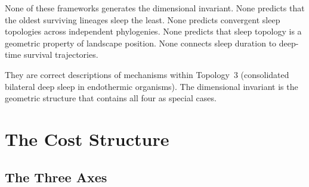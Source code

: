 \documentclass[10pt, a4paper]{article}
\begin{document}
None of these frameworks generates
the dimensional invariant. None predicts
that the oldest surviving lineages sleep
the least. None predicts convergent sleep
topologies across independent phylogenies.
None predicts that sleep topology is a
geometric property of landscape position.
None connects sleep duration to deep-time
survival trajectories.

They are correct descriptions of
mechanisms within Topology~3 (consolidated
bilateral deep sleep in endothermic
organisms). The dimensional invariant
is the geometric structure that contains
all four as special cases.

\section{The Cost Structure}
\label{sec:cost}

\subsection{The Three Axes}
\end{document}
